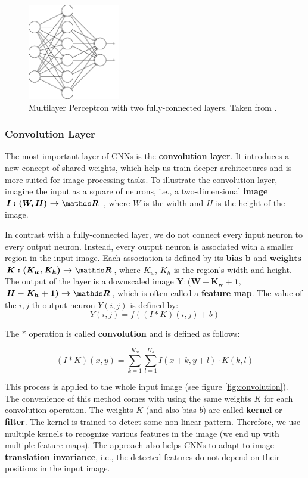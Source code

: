 \begin{figure}[h]
    \centering
    \includegraphics[width=4cm]{Sources/Figures/fully_connected_layer.png}
    \caption{Multilayer Perceptron with two fully-connected layers. Taken from
        \cite{nielsenneural}.}
    \label{fig:fcl}
\end{figure}

\subsubsection{Convolution Layer}
The most important layer of CNNs is the \textbf{convolution layer}. It
introduces a new concept of shared weights, which help us train deeper
architectures and is more suited for image processing tasks. To illustrate the
convolution layer, imagine the input as a square of neurons, i.e., a
two-dimensional \textbf{image} $\boldsymbol{I: (W, H) \rightarrow \real}$
, where ${W}$ is the width and
${H}$ is the height of the image.

In contrast with a fully-connected layer, we do not connect every input neuron
to every output neuron. Instead, every output neuron is associated with a
smaller region in the input image. Each association is defined by its
\textbf{bias} $\boldsymbol{b}$ and $\textbf{weights}$ $\boldsymbol{K:(K_w, K_h)
        \rightarrow \real}$, where $K_w$, $K_h$ is the region's width and height. The
output of the layer is a downscaled image $\boldsymbol{Y:(W - K_w + 1,}$
$\boldsymbol{H - K_h + 1)  \rightarrow \real}$, which is often called a
\textbf{feature map}. The value of the $i, j$-th output neuron $Y(i,j)$ is
defined by:
$$
    Y(i, j) = f\left((I * K)(i,j) + b\right)
$$

The $*$ operation is called \textbf{convolution} and is defined as follows:

$$
    (I * K)(x, y) = \sum\limits_{k = 1}^{K_w}\sum\limits_{l = 1}^{K_h}
    I(x + k, y + l) \cdot K(k, l)
$$

This process is applied to the whole input image (see figure
\ref{fig:convolution}). The convenience of this method comes with using the same
weights $K$ for each convolution operation. The weights $K$ (and also bias $b$)
are called \textbf{kernel} or \textbf{filter}. The kernel is trained to detect
some non-linear pattern. Therefore, we use multiple kernels to recognize
various features in the image (we end up with multiple feature maps). The
approach also helps CNNs to adapt to image \textbf{translation invariance},
i.e., the detected features do not depend on their positions in the input
image.

